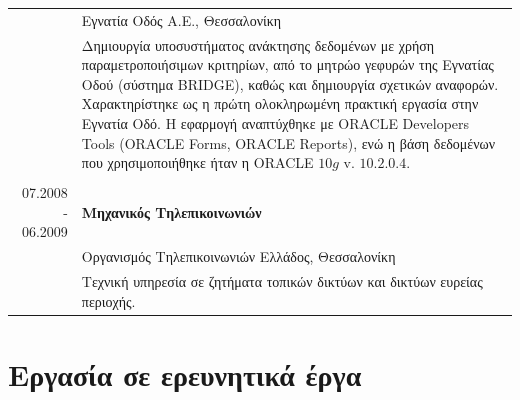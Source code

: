 \documentclass[a4paper,10pt,twoside]{article}
\begin{document}
\begin{tabular}{rp{12cm}}
                  & Εγνατία Οδός Α.Ε., Θεσσαλονίκη \\
                  & Δημιουργία υποσυστήματος ανάκτησης δεδομένων με χρήση παραμετροποιήσιμων
                    κριτηρίων, από το μητρώο γεφυρών της Εγνατίας Οδού (σύστημα BRIDGE), καθώς και
                    δημιουργία σχετικών αναφορών. Χαρακτηρίστηκε ως η πρώτη ολοκληρωμένη πρακτική
                    εργασία στην Εγνατία Οδό. Η εφαρμογή αναπτύχθηκε με ORACLE Developers Tools
                    (ORACLE Forms, ORACLE Reports), ενώ η βάση δεδομένων που χρησιμοποιήθηκε ήταν η ORACLE $10g$ v. $10.2.0.4.$\\
&\\
07.2008 - 06.2009 & \textbf{Μηχανικός Τηλεπικοινωνιών} \\
                  & Οργανισμός Τηλεπικοινωνιών Ελλάδος, Θεσσαλονίκη\\
                  & Τεχνική υπηρεσία σε ζητήματα τοπικών δικτύων και δικτύων ευρείας περιοχής. \\
\end{tabular}
\newpage


\section{Εργασία σε ερευνητικά έργα}
\end{document}
